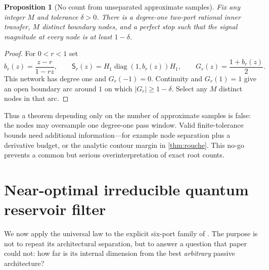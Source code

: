\documentclass[11pt]{article}
\newtheorem{proposition}[theorem]{Proposition}
\theoremstyle{definition}
\theoremstyle{remark}
\newcommand{\diag}{\operatorname{diag}}
\begin{document}
\begin{proposition}[No count from unseparated approximate samples]
\label{prop:approxnogo}
Fix any integer $M$ and tolerance $\delta>0$.
There is a degree-one two-port rational inner transfer, $M$ distinct boundary
nodes, and a perfect stop such that the signal magnitude at every node is at
least $1-\delta$.
\end{proposition}

\begin{proof}
For $0<r<1$ set
\[
 b_r(z)=\frac{z-r}{1-rz},\qquad
 \mathsf S_r(z)=H_1\diag(1,b_r(z))H_1,
 \qquad G_r(z)=\frac{1+b_r(z)}2.
\]
This network has degree one and $G_r(-1)=0$.  Continuity and $G_r(1)=1$ give
an open boundary arc around $1$ on which $|G_r|\geq1-\delta$.  Select any $M$
distinct nodes in that arc.
\end{proof}

Thus a theorem depending only on the number of approximate samples is false:
the nodes may oversample one degree-one pass window.  Valid finite-tolerance
bounds need additional information---for example node separation plus a
derivative budget, or the analytic contour margin in \cref{thm:rouche}.  This
no-go prevents a common but serious overinterpretation of exact root counts.

\section{Near-optimal irreducible quantum reservoir filter}
\label{sec:irreducible}

We now apply the universal law to the explicit six-port family of
\cite{ErikssonReservoir2026}.  The purpose is not to repeat its architectural
separation, but to answer a question that paper could not: how far is its
internal dimension from the best \emph{arbitrary} passive architecture?
\end{document}
